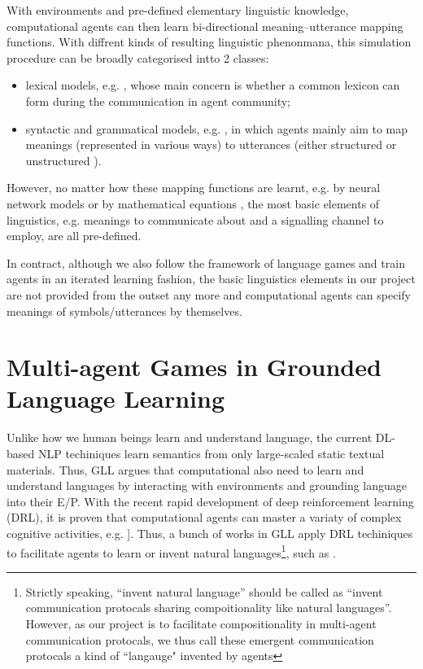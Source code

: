 With environments and pre-defined elementary linguistic knowledge, computational agents can then learn bi-directional meaning–utterance mapping functions\cite{gong2013computer}. With diffrent kinds of resulting linguistic phenonmana, this simulation procedure can be broadly categorised intto 2 classes:
\begin{itemize}
  \item lexical models, e.g. \cite{steels2005emergence, baronchelli2006sharp, puglisi2008cultural}, whose main concern is whether a common lexicon can form during the communication in agent community;
  \item syntactic and grammatical models, e.g. \cite{kirby1999function, vogt2005acquisition}, in which agents mainly aim to map meanings (represented in various ways) to utterances (either structured or unstructured ).
\end{itemize}

However, no matter how these mapping functions are learnt, e.g. by neural network models \cite{munroe2002learning} or by mathematical equations \cite{minett2008modelling, ke2008language}, the most basic elements of linguistics, e.g. meanings to communicate about and a signalling channel to employ, are all pre-defined.

In contract, although we also follow the framework of language games and train agents in an iterated learning fashion, the basic linguistics elements in our project are not provided from the outset any more and computational agents can specify meanings of symbols/utterances by themselves.

\section{Multi-agent Games in Grounded Language Learning}
\label{sec2.2:gll}

Unlike how we human beings learn and understand language, the current DL-based NLP techiniques learn semantics from only large-scaled static textual materials. Thus, GLL argues that computational also need to learn and understand languages by interacting with environments and grounding language into their E/P. With the recent rapid development of deep reinforcement learning (DRL), it is proven that computational agents can master a variaty of complex cognitive activities, e.g. \cite{mnih2015human, silver2017mastering}]. Thus, a bunch of works in GLL apply DRL techiniques to facilitate agents to learn or invent natural languages\footnote{Strictly speaking, ``invent natural language'' should be called as ``invent communication protocals sharing compoitionality like natural languages''. However, as our project is to facilitate compositionality in multi-agent communication protocals, we thus call these emergent communication protocals a kind of ``langauge" invented by agents}, such as \cite{hermann2017grounded, mordatch2018emergence, havrylov2017emergence, hill2017understanding}.

